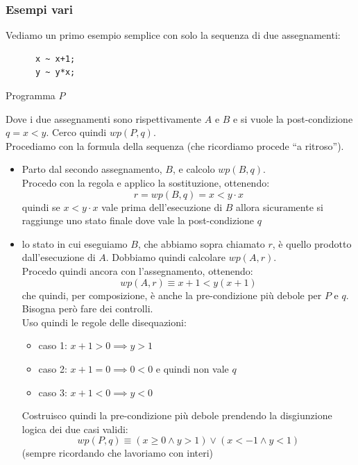 				      				\subsubsection{Esempi vari}
				      				\begin{esempio}
				      					Vediamo un primo esempio semplice con solo la sequenza di due assegnamenti:
				      					\begin{listing}[H]
				      						\begin{lstlisting}
      x ~ x+1;
      y ~ y*x;
				      					\end{lstlisting}
				      					\caption{Programma $P$}
				      					\end{listing}
				      					Dove i due assegnamenti sono rispettivamente $A$ e $B$ e si vuole la
				      					post-condizione $q=x<y$. Cerco quindi $wp(P,q)$.\\
				      					Procediamo con la formula della sequenza (che ricordiamo procede ``a
				      					ritroso'').
				      					\begin{itemize}
				      						\item Parto dal secondo assegnamento, $B$, e calcolo $wp(B,q)$.\\
				      						      Procedo con la regola e applico la sostituzione, ottenendo:
				      						      \[r=wp(B,q)=x<y\cdot x\]
				      						      quindi se $x<y\cdot x$ vale prima dell'esecuzione di $B$ allora sicuramente
				      						      si raggiunge uno stato finale dove vale la post-condizione $q$ 
				      						\item lo stato in cui eseguiamo $B$, che abbiamo sopra chiamato $r$, è
				      						      quello prodotto dall'esecuzione di $A$. Dobbiamo quindi calcolare
				      						      $wp(A,r)$.\\
				      						      Procedo quindi ancora con l'assegnamento, ottenendo:
				      						      \[wp(A,r)\equiv x+1<y(x+1)\]
				      						      che quindi, per composizione, è anche la pre-condizione più debole per $P$ e
				      						      $q$. Bisogna però fare dei controlli.\\
				      						      Uso quindi le regole delle disequazioni:
				      						      \begin{itemize}
				      						      	\item caso 1: $x+1>0\implies y>1$
				      						      	\item caso 2: $x+1=0\implies 0<0$ e quindi non vale $q$
				      						      	\item caso 3: $x+1<0\implies y<0$
				      						      \end{itemize}
				      						      Costruisco quindi la pre-condizione più debole prendendo la disgiunzione
				      						      logica dei due casi validi:
				      						      \[wp(P,q)\equiv(x\geq 0\land y>1)\lor (x<-1\land y<1)\]
				      						      (sempre ricordando che lavoriamo con interi)
				      					\end{itemize}
				      				\end{esempio}
